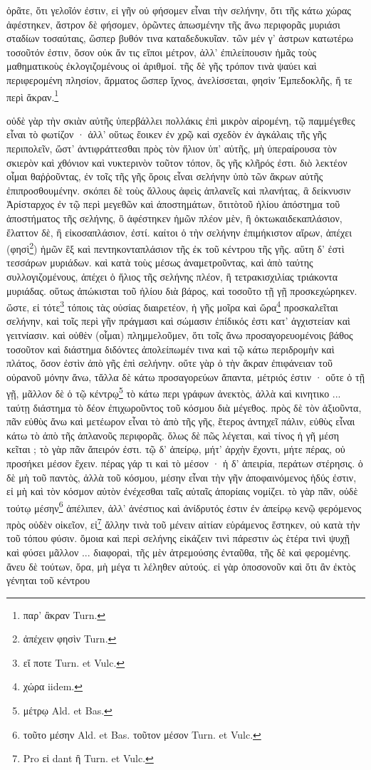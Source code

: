\documentclass[a4paper, 11pt, oneside, polutonikogreek, german]{article}
\begin{document}
ὁρᾶτε, ὅτι γελοῖόν ἐστιν, εἰ γῆν οὐ φήσομεν εἶναι τὴν σελήνην, ὅτι τῆς κάτω χώρας ἀφέστηκεν, ἄστρον δὲ φήσομεν, ὁρῶντες ἀπωσμένην τῆς ἄνω περιφορᾶς μυριάσι σταδίων τοσαύταις, ὥσπερ βυθόν τινα καταδεδυκυῖαν. τῶν μέν γ' ἀστρων κατωτέρω τοσοῦτόν ἐστιν, ὅσον οὐκ ἄν τις εἴποι μέτρον, ἀλλ' ἐπιλείπουσιν ἡμᾶς τοὺς μαθηματικοὺς ἐκλογιζομένους οἱ ἀριθμοί. τῆς δὲ γῆς τρόπον τινὰ ψαύει καὶ περιφερομένη πλησίον, ἅρματος ὥσπερ ἴχνος, ἀνελίσσεται, φησὶν Ἐμπεδοκλῆς, ἥ τε περὶ ἄκραν.\footnote{παρ' ἂκραν Turn.}

οὐδὲ γὰρ τὴν σκιὰν αὐτῆς ὑπερβάλλει πολλάκις ἐπὶ μικρὸν αἰρομένη, τῷ παμμέγεθες εἶναι τὸ φωτίζον · ἀλλ' οὕτως ἔοικεν ἐν χρῷ καὶ σχεδὸν ἐν ἀγκάλαις τῆς γῆς περιπολεῖν, ὥστ' ἀντιφράττεσθαι πρὸς τὸν ἥλιον ὑπ' αὐτῆς, μὴ ὑπεραίρουσα τὸν σκιερὸν καὶ χθόνιον καὶ νυκτερινὸν τοῦτον τόπον, ὃς γῆς κλῆρός ἐστι. διὸ λεκτέον οἶμαι θαῤῥοῦντας, ἐν τοῖς τῆς γῆς ὅροις εἶναι σελήνην ὑπὸ τῶν ἄκρων αὐτῆς ἐπιπροσθουμένην. σκόπει δὲ τοὺς ἄλλους ἀφεὶς ἀπλανεῖς καὶ πλανήτας, ἃ δείκνυσιν Ἀρίσταρχος ἐν τῷ περὶ μεγεθῶν καὶ ἀποστημάτων, ὅτιτὸτοῦ ἡλίου ἀπόστημα τοῦ ἀποστήματος τῆς σελήνης, ὃ ἀφέστηκεν ἡμῶν πλέον μὲν, ἢ ὀκτωκαιδεκαπλάσιον, ἔλαττον δὲ, ἢ εἰκοσαπλάσιον, ἐστί. καίτοι ὁ τὴν σελήνην ἐπιμήκιστον αἴρων, ἀπέχει (φησὶ\footnote{ἀπέχειν φησὶν Turn.}) ἡμῶν ἓξ καὶ πεντηκονταπλάσιον τῆς ἐκ τοῦ κέντρου τῆς γῆς. αὕτη δ' ἐστὶ τεσσάρων μυριάδων. καὶ κατὰ τοὺς μέσως ἀναμετροῦντας, καὶ ἀπὸ ταύτης συλλογιζομένους, ἀπέχει ὁ ἥλιος τῆς σελήνης πλέον, ἢ τετρακισχιλίας τριάκοντα μυριάδας. οὕτως ἀπώκισται τοῦ ἡλίου διὰ βάρος, καὶ τοσοῦτο τῇ γῇ προσκεχώρηκεν. ὥστε, εἰ τότε\footnote{εἴ ποτε Turn. et Vulc.} τόποις τὰς οὐσίας διαιρετέον, ἡ γῆς μοῖρα καὶ ὥρα\footnote{χώρα iidem.} προσκαλεῖται σελήνην, καὶ τοῖς περὶ γῆν πράγμασι καὶ σώμασιν ἐπίδικός ἐστι κατ' ἀγχιστείαν καὶ γειτνίασιν. καὶ οὐθὲν (οἶμαι) πλημμελοῦμεν, ὅτι τοῖς ἄνω προσαγορευομένοις βάθος τοσοῦτον καὶ διάστημα διδόντες ἀπολείπωμέν τινα καὶ τῷ κάτω περιδρομὴν καὶ πλάτος, ὅσον ἐστὶν ἀπὸ γῆς ἐπὶ σελήνην. οὔτε γὰρ ὁ τὴν ἄκραν ἐπιφάνειαν τοῦ οὐρανοῦ μόνην ἄνω, τἄλλα δὲ κάτω προσαγορεύων ἅπαντα, μέτριός ἐστιν · οὔτε ὁ τῇ γῇ, μᾶλλον δὲ ὁ τῷ κέντρῳ\footnote{μέτρῳ Ald. et Bas.} τὸ κάτω περι γράφων ἀνεκτὸς, ἀλλὰ καὶ κινητικο ... ταύτῃ διάστημα τὸ δέον ἐπιχωροῦντος τοῦ κόσμου διὰ μέγεθος. πρὸς δὲ τὸν ἀξιοῦντα, πᾶν εὐθὺς ἄνω καὶ μετέωρον εἶναι τὸ ἀπὸ τῆς γῆς, ἕτερος ἀντηχεῖ πάλιν, εὐθὺς εἶναι κάτω τὸ ἀπὸ τῆς ἀπλανοῦς περιφορᾶς. ὅλως δὲ πῶς λέγεται, καὶ τίνος ἡ γῆ μέση κεῖται ; τὸ γὰρ πᾶν ἄπειρόν ἐστι. τῷ δ' ἀπείρῳ, μήτ' ἀρχὴν ἔχοντι, μήτε πέρας, οὐ προσήκει μέσον ἔχειν. πέρας γάρ τι καὶ τὸ μέσον · ἡ δ' ἀπειρία, περάτων στέρησις. ὁ δὲ μὴ τοῦ παντὸς, ἀλλὰ τοῦ κόσμου, μέσην εἶναι τὴν γῆν ἀποφαινόμενος ἡδύς ἐστιν, εἰ μὴ καὶ τὸν κόσμον αὐτὸν ἐνέχεσθαι ταῖς αὐταῖς ἀπορίαις νομίζει. τὸ γὰρ πᾶν, οὐδὲ τούτῳ μέσην\footnote{τοῦτο μέσην Ald. et Bas. τοῦτον μέσον Turn. et Vulc.} ἀπέλιπεν, ἀλλ' ἀνέστιος καὶ ἀνίδρυτός ἐστιν ἐν ἀπείρῳ κενῷ φερόμενος πρὸς οὐδὲν οἰκεῖον, εἰ\footnote{Pro εἰ dant ἢ Turn. et Vulc.} ἄλλην τινὰ τοῦ μένειν αἰτίαν εὑράμενος ἕστηκεν, οὐ κατὰ τὴν τοῦ τόπου φύσιν. ὅμοια καὶ περὶ σελήνης εἰκάζειν τινὶ πάρεστιν ὡς ἑτέρα τινὶ ψυχῇ καὶ φύσει μᾶλλον ... διαφοραὶ, τῆς μὲν ἀτρεμούσης ἐνταῦθα, τῆς δὲ καὶ φερομένης. ἄνευ δὲ τούτων, ὅρα, μὴ μέγα τι λέληθεν αὐτούς. εἰ γὰρ ὁποσονοῦν καὶ ὅτι ἂν ἐκτὸς γένηται τοῦ κέντρου 
\end{document}
